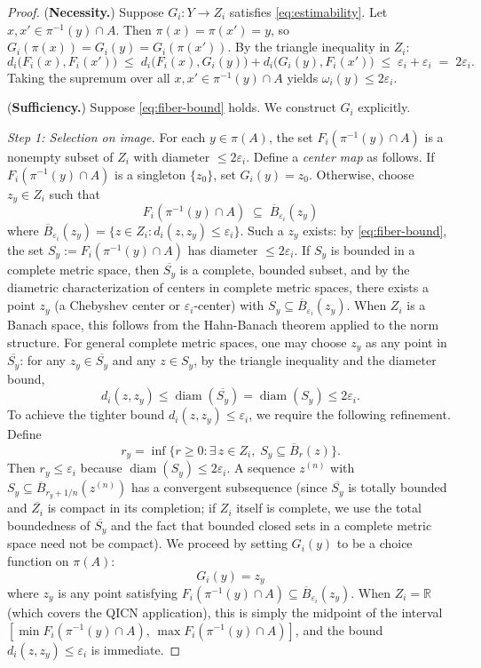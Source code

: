 \documentclass[11pt]{article}
\begin{document}
\begin{proof}
(\textbf{Necessity.}) Suppose $G_i\colon Y\to Z_i$ satisfies \eqref{eq:estimability}. Let $x,x'\in\pi^{-1}(y)\cap A$. Then $\pi(x)=\pi(x')=y$, so $G_i(\pi(x))=G_i(y)=G_i(\pi(x'))$. By the triangle inequality in $Z_i$:
\[
d_i\bigl(F_i(x),F_i(x')\bigr)
\;\leq\;d_i\bigl(F_i(x),G_i(y)\bigr)+d_i\bigl(G_i(y),F_i(x')\bigr)
\;\leq\;\varepsilon_i+\varepsilon_i\;=\;2\varepsilon_i.
\]
Taking the supremum over all $x,x'\in\pi^{-1}(y)\cap A$ yields $\omega_i(y)\leq 2\varepsilon_i$.

\medskip\noindent(\textbf{Sufficiency.}) Suppose \eqref{eq:fiber-bound} holds. We construct $G_i$ explicitly.

\emph{Step 1: Selection on image.} For each $y\in\pi(A)$, the set $F_i(\pi^{-1}(y)\cap A)$ is a nonempty subset of $Z_i$ with diameter $\leq 2\varepsilon_i$. Define a \emph{center map} as follows. If $F_i(\pi^{-1}(y)\cap A)$ is a singleton $\{z_0\}$, set $G_i(y)=z_0$. Otherwise, choose $z_y\in Z_i$ such that
\[
F_i(\pi^{-1}(y)\cap A)\;\subseteq\;\overline{B}_{\varepsilon_i}(z_y)
\]
where $\overline{B}_{\varepsilon_i}(z_y)=\{z\in Z_i:d_i(z,z_y)\leq\varepsilon_i\}$. Such a $z_y$ exists: by \eqref{eq:fiber-bound}, the set $S_y:=F_i(\pi^{-1}(y)\cap A)$ has diameter $\leq 2\varepsilon_i$. If $S_y$ is bounded in a complete metric space, then $\overline{S_y}$ is a complete, bounded subset, and by the diametric characterization of centers in complete metric spaces, there exists a point $z_y$ (a Chebyshev center or $\varepsilon_i$-center) with $S_y\subseteq\overline{B}_{\varepsilon_i}(z_y)$. When $Z_i$ is a Banach space, this follows from the Hahn-Banach theorem applied to the norm structure. For general complete metric spaces, one may choose $z_y$ as any point in $\overline{S_y}$: for any $z_y\in\overline{S_y}$ and any $z\in S_y$, by the triangle inequality and the diameter bound,
\[
d_i(z,z_y)\leq\operatorname{diam}(\overline{S_y})=\operatorname{diam}(S_y)\leq 2\varepsilon_i.
\]
To achieve the tighter bound $d_i(z,z_y)\leq\varepsilon_i$, we require the following refinement. Define
\[
r_y=\inf\bigl\{r\geq 0:\exists\,z\in Z_i,\; S_y\subseteq\overline{B}_r(z)\bigr\}.
\]
Then $r_y\leq\varepsilon_i$ because $\operatorname{diam}(S_y)\leq 2\varepsilon_i$. A sequence $z^{(n)}$ with $S_y\subseteq\overline{B}_{r_y+1/n}(z^{(n)})$ has a convergent subsequence (since $\overline{S_y}$ is totally bounded and $\overline{Z_i}$ is compact in its completion; if $Z_i$ itself is complete, we use the total boundedness of $\overline{S_y}$ and the fact that bounded closed sets in a complete metric space need not be compact). We proceed by setting $G_i(y)$ to be a choice function on $\pi(A)$:
\[
G_i(y)=z_y
\]
where $z_y$ is any point satisfying $F_i(\pi^{-1}(y)\cap A)\subseteq\overline{B}_{\varepsilon_i}(z_y)$. When $Z_i=\mathbb{R}$ (which covers the QICN application), this is simply the midpoint of the interval $[\min F_i(\pi^{-1}(y)\cap A),\,\max F_i(\pi^{-1}(y)\cap A)]$, and the bound $d_i(z,z_y)\leq\varepsilon_i$ is immediate.


\end{proof}
\end{document}
